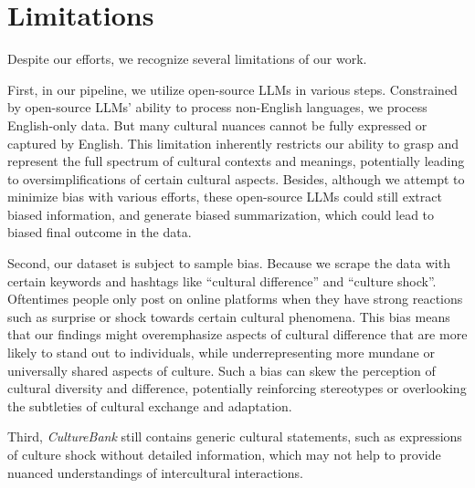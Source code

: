 \documentclass{article} %
\newcommand{\dataname}{\textit{CultureBank}\xspace}
\begin{document}






\newpage
\appendix

\section{Limitations}
\label{sec:limitation}
Despite our efforts, we recognize several limitations of our work. 

First, in our pipeline, we utilize open-source LLMs in various steps. Constrained by open-source LLMs' ability to process non-English languages, we process English-only data. But many cultural nuances cannot be fully expressed or captured  by English. This limitation inherently restricts our ability to grasp and represent the full spectrum of cultural contexts and meanings, potentially leading to oversimplifications of certain cultural aspects. Besides, although we attempt to minimize bias with various efforts, these open-source LLMs could still extract biased information, and generate biased summarization, which could lead to biased final outcome in the data.  


Second, our dataset is subject to sample bias. Because we scrape the data with certain keywords and hashtags like ``cultural difference'' and ``culture shock''. Oftentimes people only post on online platforms when they have strong reactions such as surprise or shock towards certain cultural phenomena. %
This bias means that our findings might overemphasize aspects of cultural difference that are more likely to  stand out to individuals, while underrepresenting more mundane or universally shared aspects of culture. Such a bias can skew the perception of cultural diversity and difference, potentially reinforcing stereotypes or overlooking the subtleties of cultural exchange and adaptation.

Third, \dataname still contains generic cultural statements, such as expressions of culture shock without detailed information, which may not help to provide nuanced understandings of intercultural interactions.
\end{document}
